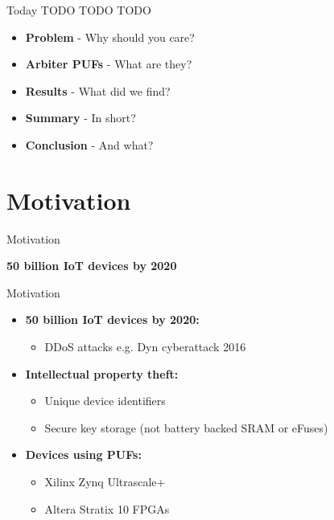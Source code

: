 \documentclass[10pt, compress]{beamer}
\begin{document}
\begin{frame}{Today}
    TODO TODO TODO
    \begin{itemize}[itemsep=0.5cm]
        \item \textbf{Problem} - Why should you care?
        \item \textbf{Arbiter PUFs} - What are they?
        \item \textbf{Results} - What did we find?
        \item \textbf{Summary} - In short?
        \item \textbf{Conclusion} - And what?
    \end{itemize}
\end{frame}

\section{Motivation}

\begin{frame}{Motivation}
    \begin{center}
        \LARGE\textbf{50 billion IoT devices by 2020}
    \end{center}
\end{frame}

\begin{frame}{Motivation}
    \begin{itemize}[itemsep=0.5cm]
        \item \textbf{50 billion IoT devices by 2020:}
        \begin{itemize}
            \item DDoS attacks e.g. Dyn cyberattack 2016
        \end{itemize}
        \item \textbf{Intellectual property theft:} 
        \begin{itemize}
            \item Unique device identifiers
            \item Secure key storage (not battery backed SRAM or eFuses)
        \end{itemize}
        \item \textbf{Devices using PUFs:}
        \begin{itemize}
            \item Xilinx Zynq Ultrascale+ 
            \item Altera Stratix 10 FPGAs
        \end{itemize}
    \end{itemize}
\end{frame}
\end{document}

